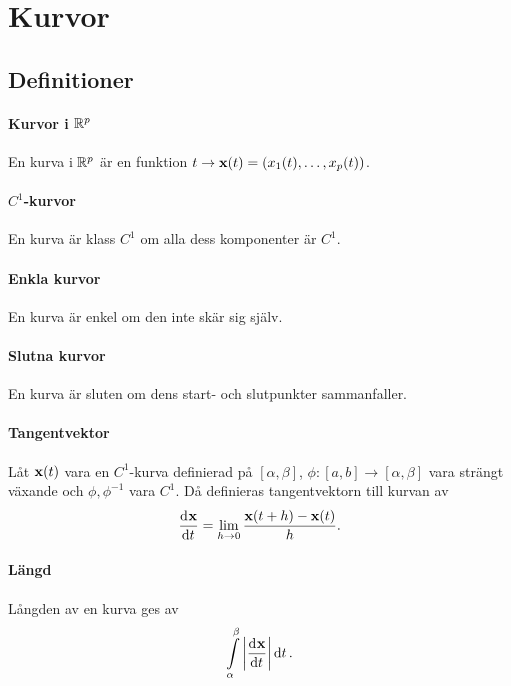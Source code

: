 \section{Kurvor}

\subsection{Definitioner}

\paragraph{Kurvor i $\mathbb{R}^p$}
En kurva i $\mathbb{R}^p$ är en funktion $t\to\vect{x}(t) = (x_1(t), \dots, x_p(t))$.

\paragraph{$C^1$-kurvor}
En kurva är klass $C^1$ om alla dess komponenter är $C^1$.

\paragraph{Enkla kurvor}
En kurva är enkel om den inte skär sig själv.

\paragraph{Slutna kurvor}
En kurva är sluten om dens start- och slutpunkter sammanfaller.

\paragraph{Tangentvektor}
Låt $\vect{x}(t)$ vara en $C^1$-kurva definierad på $[\alpha, \beta]$, $\phi: [a, b]\to [\alpha, \beta]$ vara strängt växande och $\phi, \phi^{-1}$ vara $C^1$. Då definieras tangentvektorn till kurvan av
\begin{align*}
	\deval{\vect{x}}{t}{t} = \limit{h}{0}\frac{\vect{x}(t + h) - \vect{x}(t)}{h}.
\end{align*}

\paragraph{Längd}
Långden av en kurva ges av
\begin{align*}
	\int\limits_{\alpha}^{\beta}\abs{\deval{\vect{x}}{t}{t}}\dd{t}.
\end{align*}

